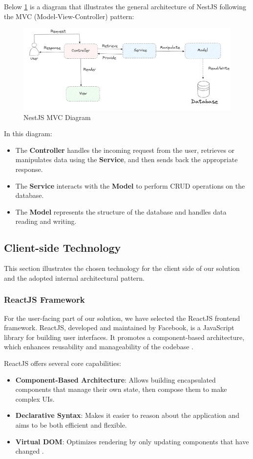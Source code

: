 Below \ref{fig:mvc-diagram} is a diagram that illustrates the general architecture of NestJS following the MVC (Model-View-Controller) pattern:

\begin{figure}[H]
    \centering
    \includegraphics[width=\textwidth]{src/assets/diagrams/mvcDiagram.png}
    \caption{NestJS MVC Diagram}
    \label{fig:mvc-diagram}
\end{figure}

In this diagram:
\begin{itemize}
    \item The \textbf{Controller} handles the incoming request from the user, retrieves or manipulates data using the \textbf{Service}, and then sends back the appropriate response.
    \item The \textbf{Service} interacts with the \textbf{Model} to perform CRUD operations on the database.
    \item The \textbf{Model} represents the structure of the database and handles data reading and writing.
\end{itemize}

\subsection{Client-side Technology}
This section illustrates the chosen technology for the client side of our solution and the adopted internal architectural pattern.
\subsubsection*{ReactJS Framework}
For the user-facing part of our solution, we have selected the ReactJS frontend framework. ReactJS, developed and maintained by Facebook, is a JavaScript library for building user interfaces. It promotes a component-based architecture, which enhances reusability and manageability of the codebase \cite{ReactUpAndRunning}.

ReactJS offers several core capabilities:
\begin{itemize}
    \item \textbf{Component-Based Architecture}: Allows building encapsulated components that manage their own state, then compose them to make complex UIs.
    \item \textbf{Declarative Syntax}: Makes it easier to reason about the application and aims to be both efficient and flexible.
    \item \textbf{Virtual DOM}: Optimizes rendering by only updating components that have changed \cite{ProReact}.
\end{itemize}

